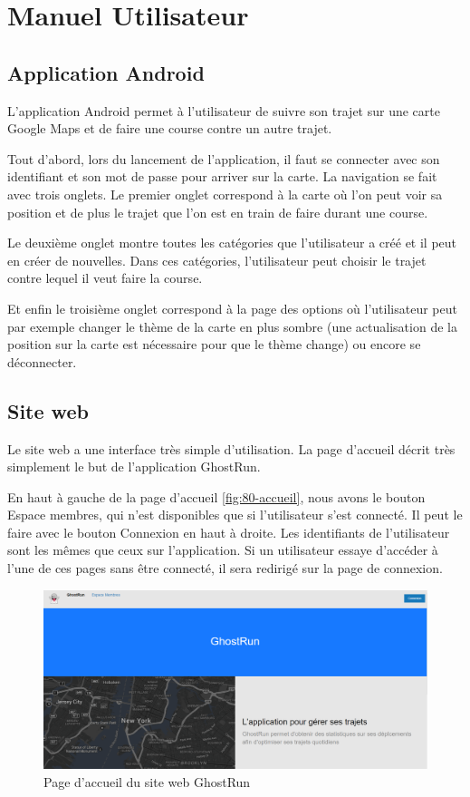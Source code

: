 \chapter{Manuel Utilisateur}

\section{Application Android}

L'application Android permet à l'utilisateur de suivre son trajet sur une carte Google Maps et de faire une course contre un autre trajet.

Tout d'abord, lors du lancement de l'application, il faut se connecter avec son identifiant et son mot de passe pour arriver sur la carte. La navigation se fait avec trois onglets. Le premier onglet correspond à la carte où l'on peut voir sa position et de plus le trajet que l'on est en train de faire durant une course.

Le deuxième onglet montre toutes les catégories que l'utilisateur a créé et il peut en créer de nouvelles. Dans ces catégories, l'utilisateur peut choisir le trajet contre lequel il veut faire la course.

Et enfin le troisième onglet correspond à la page des options où l'utilisateur peut par exemple changer le thème de la carte en plus sombre (une actualisation de la position sur la carte est nécessaire pour que le thème change) ou encore se déconnecter.

\section{Site web}

Le site web a une interface très simple d'utilisation. La page d'accueil décrit très simplement le but de l'application GhostRun.

En haut à gauche de la page d'accueil \autoref{fig:80-accueil}, nous avons le bouton Espace membres, qui n'est disponibles que si l'utilisateur s'est connecté. Il peut le faire avec le bouton Connexion en haut à droite. Les identifiants de l'utilisateur sont les mêmes que ceux sur l'application. Si un utilisateur essaye d'accéder à l'une de ces pages sans être connecté, il sera redirigé sur la page de connexion.

\begin{figure}[H]
    \centering
    \includegraphics[keepaspectratio, width=2\textwidth/2, height=2\textheight/5]{ima/accueil}
    \caption{Page d'accueil du site web GhostRun}
    \label{fig:80-accueil}
\end{figure}

